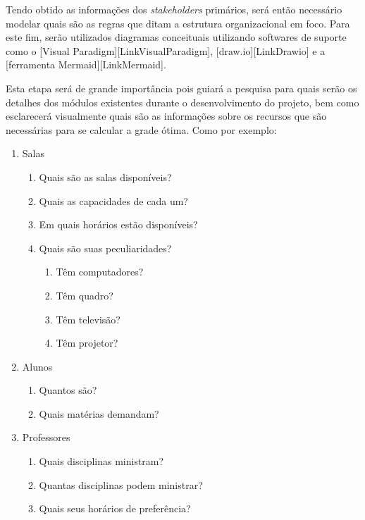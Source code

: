 
    Tendo obtido as informações dos \textit{stakeholders} primários, será então necessário modelar quais são as regras que ditam a estrutura organizacional em foco. Para este fim, serão utilizados diagramas conceituais utilizando softwares de suporte como o [Visual Paradigm][LinkVisualParadigm], [draw.io][LinkDrawio] e a [ferramenta Mermaid][LinkMermaid].


    Esta etapa será de grande importância pois guiará a pesquisa para quais serão os detalhes dos módulos existentes durante o desenvolvimento do projeto, bem como esclarecerá visualmente quais são as informações sobre os recursos que são necessárias para se calcular a grade ótima. Como por exemplo:


    \begin{enumerate}
        \item Salas
        \begin{enumerate}
            \item Quais são as salas disponíveis?
            \item Quais as capacidades de cada um?
            \item Em quais horários estão disponíveis?
            \item Quais são suas peculiaridades?
            \begin{enumerate}
                \item Têm computadores?
                \item Têm quadro?
                \item Têm televisão?
                \item Têm projetor?
            \end{enumerate}
        \end{enumerate}
        \item Alunos
        \begin{enumerate}
            \item Quantos são?
            \item Quais matérias demandam?
        \end{enumerate}
        \item Professores
        \begin{enumerate}
            \item Quais disciplinas ministram?
            \item Quantas disciplinas podem ministrar?
            \item Quais seus horários de preferência?
        \end{enumerate}
    \end{enumerate}

